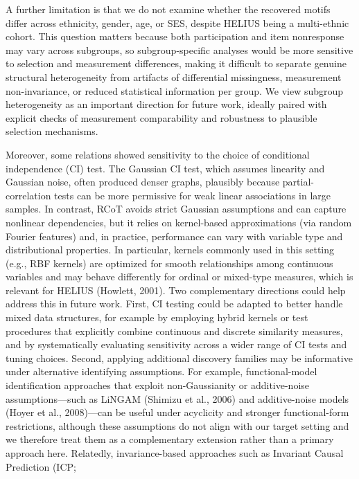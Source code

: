 \documentclass[
]{article}
\begin{document}
\textcolor{BrickRed}{A further limitation is that we do not examine whether the recovered motifs differ across ethnicity, gender, age, or SES, despite HELIUS being a multi-ethnic cohort. This question matters because both participation and item nonresponse may vary across subgroups, so subgroup-specific analyses would be more sensitive to selection and measurement differences, making it difficult to separate genuine structural heterogeneity from artifacts of differential missingness, measurement non-invariance, or reduced statistical information per group. We view subgroup heterogeneity as an important direction for future work, ideally paired with explicit checks of measurement comparability and robustness to plausible selection mechanisms.}

Moreover, some relations showed sensitivity to the choice of conditional
independence (CI) test. The Gaussian CI test, which assumes linearity
and Gaussian noise, often produced denser graphs, plausibly because
partial-correlation tests can be more permissive for weak linear
associations in large samples. In contrast, RCoT avoids strict Gaussian
assumptions and can capture nonlinear dependencies, but it relies on
kernel-based approximations (via random Fourier features) and, in
practice, performance can vary with variable type and distributional
properties. In particular, kernels commonly used in this setting (e.g.,
RBF kernels) are optimized for smooth relationships among continuous
variables and may behave differently for ordinal or mixed-type measures,
which is relevant for HELIUS (Howlett, 2001).
\textcolor{BrickRed}{Two complementary directions could help address this in future work. First, CI testing could be adapted to better handle mixed data structures, for example by employing hybrid kernels or test procedures that explicitly combine continuous and discrete similarity measures, and by systematically evaluating sensitivity across a wider range of CI tests and tuning choices. Second, applying additional discovery families may be informative under alternative identifying assumptions. 
For example, functional-model identification approaches that exploit non-Gaussianity or additive-noise assumptions—such as LiNGAM}
(Shimizu et al., 2006) \textcolor{BrickRed}{and additive-noise models}
(Hoyer et al.,
2008)\textcolor{BrickRed}{—can be useful under acyclicity and stronger functional-form restrictions, although these assumptions do not align with our target setting and we therefore treat them as a complementary extension rather than a primary approach here. Relatedly, invariance-based approaches such as Invariant Causal Prediction (ICP;}
\end{document}
